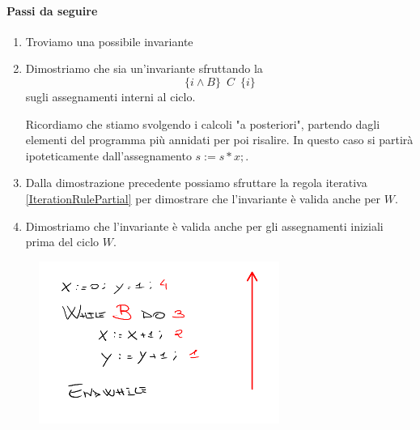 \begin{esempio}
				      			\paragraph{Passi da seguire}
				      			\begin{enumerate}
				      			    \item Troviamo una possibile invariante
				      			   \item Dimostriamo che sia un'invariante sfruttando la \[\{i\land B\}\,\,\, C\,\,\,\{i\}\]
				      			   sugli assegnamenti interni al ciclo.
				      			   \begin{nota}
				      			    Ricordiamo che stiamo svolgendo i calcoli "a posteriori", partendo dagli elementi del programma più annidati per poi risalire. In questo caso si partirà ipoteticamente dall'assegnamento $s := s * x;$.
				      			   \end{nota}
				      			   \item Dalla dimostrazione precedente possiamo sfruttare la regola iterativa \ref{IterationRulePartial} per dimostrare che l'invariante è valida anche per $W$.
				      			   \item Dimostriamo che l'invariante è valida anche per gli assegnamenti iniziali prima del ciclo $W$.
				      			\end{enumerate}
				      			\begin{figure}[H]
				      			    \centering
				      			    \includegraphics[width=0.7\textwidth]{img/IterationSteps.png}
				      			\end{figure}
				     
				      							      			  

\end{esempio}
